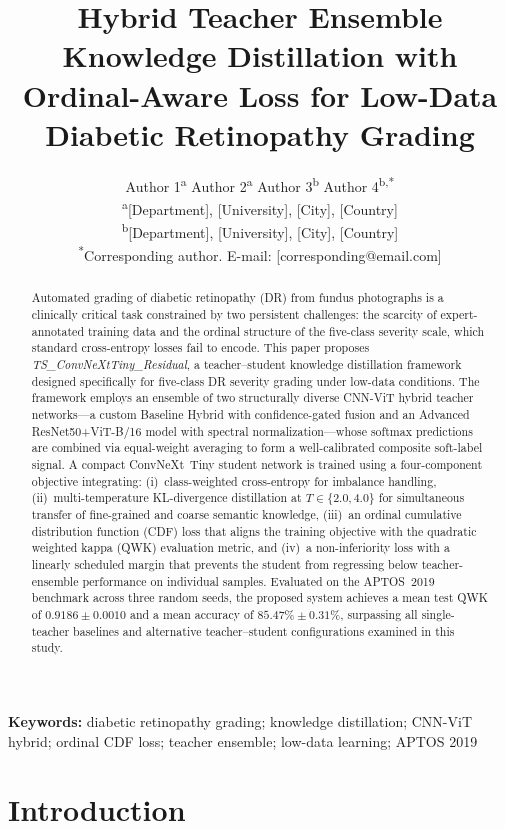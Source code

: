 \documentclass[10pt, twocolumn]{article}
\title{\textbf{Hybrid Teacher Ensemble Knowledge Distillation with\\
Ordinal-Aware Loss for Low-Data Diabetic Retinopathy Grading}}
\author{
  Author 1\textsuperscript{a} \quad
  Author 2\textsuperscript{a} \quad
  Author 3\textsuperscript{b} \quad
  Author 4\textsuperscript{b,*}\\[4pt]
  \textsuperscript{a}\small{[Department], [University], [City], [Country]}\\
  \textsuperscript{b}\small{[Department], [University], [City], [Country]}\\
  \textsuperscript{*}\small{Corresponding author. E-mail: [corresponding@email.com]}
}
\date{}
\begin{document}
\maketitle

\begin{abstract}
Automated grading of diabetic retinopathy (DR) from fundus photographs is a
clinically critical task constrained by two persistent challenges: the scarcity of
expert-annotated training data and the ordinal structure of the five-class severity
scale, which standard cross-entropy losses fail to encode. This paper proposes
\textit{TS\_ConvNeXtTiny\_Residual}, a teacher--student knowledge distillation
framework designed specifically for five-class DR severity grading under low-data
conditions. The framework employs an ensemble of two structurally diverse CNN-ViT
hybrid teacher networks---a custom Baseline Hybrid with confidence-gated fusion and
an Advanced ResNet50+ViT-B/16 model with spectral normalization---whose softmax
predictions are combined via equal-weight averaging to form a well-calibrated
composite soft-label signal. A compact ConvNeXt~Tiny student network is trained
using a four-component objective integrating: (i)~class-weighted cross-entropy for
imbalance handling, (ii)~multi-temperature KL-divergence distillation at
$T \in \{2.0, 4.0\}$ for simultaneous transfer of fine-grained and coarse semantic
knowledge, (iii)~an ordinal cumulative distribution function (CDF) loss that aligns
the training objective with the quadratic weighted kappa (QWK) evaluation metric,
and (iv)~a non-inferiority loss with a linearly scheduled margin that prevents the
student from regressing below teacher-ensemble performance on individual samples.
Evaluated on the APTOS~2019 benchmark across three random seeds, the proposed
system achieves a mean test QWK of $\mathbf{0.9186 \pm 0.0010}$ and a mean
accuracy of $\mathbf{85.47\% \pm 0.31\%}$, surpassing all single-teacher baselines
and alternative teacher--student configurations examined in this study.
\end{abstract}

\textbf{Keywords:} diabetic retinopathy grading; knowledge distillation; CNN-ViT hybrid;
ordinal CDF loss; teacher ensemble; low-data learning; APTOS 2019

\section{Introduction}
\end{document}
